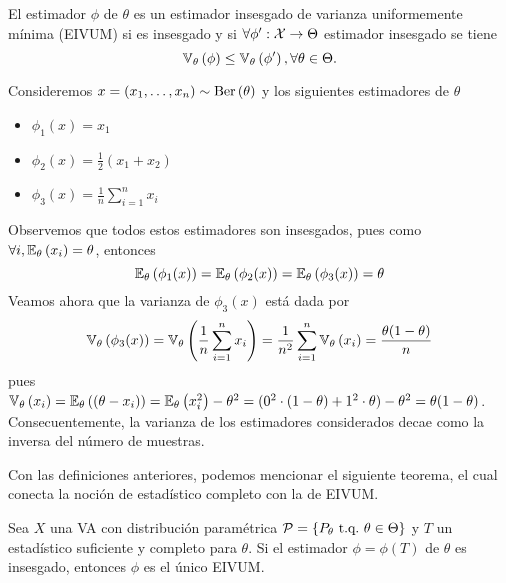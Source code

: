  \begin{definition}
  	El estimador $\phi$ de $\theta$ es un estimador insesgado de varianza uniformemente mínima (EIVUM) si es insesgado y si $\forall \phi':{\mathcal X}\rightarrow \Theta$ estimador insesgado se tiene
  	\begin{equation}
  		\mathbb{V}_\theta \left(\phi\right)\leq\mathbb{V}_\theta \left(\phi'\right), \forall \theta\in\Theta.
  	\end{equation}
  \end{definition} 

\begin{example}
	Consideremos $x=(x_1,\ldots,x_n)\sim\text{Ber}\left(\theta\right)$ y los siguientes estimadores de $\theta$
	\begin{itemize}
		\item $\phi_1(x) = x_1$
		\item $\phi_2(x) = \frac{1}{2}(x_1+x_2)$
		\item $\phi_3(x) = \frac{1}{n}\sum_{i=1}^n x_i$
	\end{itemize}
	Observemos que todos estos estimadores son insesgados, pues como $\forall i, \mathbb{E}_\theta \left(x_i\right) = \theta$, entonces 
	\begin{equation}
		\mathbb{E}_\theta \left(\phi_1(x)\right) = \mathbb{E}_\theta \left(\phi_2(x)\right) = \mathbb{E}_\theta \left(\phi_3(x)\right) = \theta
	\end{equation}
	Veamos ahora que la varianza de $\phi_3(x)$ está dada por
	\begin{equation}
		\mathbb{V}_\theta \left(\phi_3(x)\right) = \mathbb{V}_\theta \left(\frac{1}{n}\sum_{i=1}^n x_i\right) = \frac{1}{n^2}\sum_{i=1}^n \mathbb{V}_\theta \left(x_i\right) = \frac{\theta(1-\theta)}{n}
	\end{equation}
	pues $\mathbb{V}_\theta \left(x_i\right) = \mathbb{E}_\theta \left((\theta - x_i)\right) = \mathbb{E}_\theta \left(x_i^2\right) - \theta^2 = (0^2 \cdot (1-\theta) + 1^2 \cdot \theta) - \theta^2 = \theta(1-\theta)$. Consecuentemente, la varianza de los estimadores considerados decae como la inversa del número de muestras.
\end{example}

Con las definiciones anteriores, podemos mencionar el siguiente teorema, el cual conecta la noción de estadístico completo con la de EIVUM. 

\begin{theorem}
	Sea $X$ una VA con distribución paramétrica $\mathcal{P} = \{P_\theta\ {\text{t.q.}}\ \theta\in\Theta\}$ y $T$ un estadístico suficiente y completo para $\theta$. Si el estimador $\phi = \phi(T)$ de $\theta$ es insesgado, entonces $\phi$ es el único EIVUM. 
 \end{theorem} 

